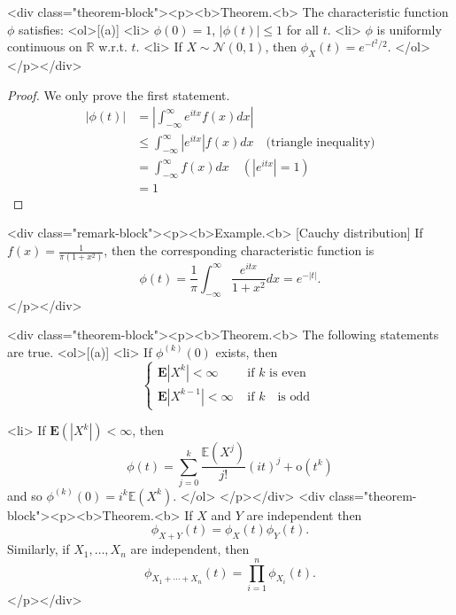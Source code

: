<div class="theorem-block"><p><b>Theorem.<b> 
The characteristic function $\phi$ satisfies:
<ol>[(a)]
    <li> $\phi(0) = 1$, $\left\vert \phi(t) \right\vert \leq 1$ for all $t$.
    <li> $\phi$ is uniformly continuous on $\mathbb{R}$ w.r.t. $t$.
    <li> If $X \sim \mathcal{N}(0,1)$, then $\phi_{X}(t) = e^{-t^2/2}$.
</ol>
</p></div>

\begin{proof}
We only prove the first statement.
$$\begin{equation}
    \begin{split}
        \left\vert \phi(t) \right\vert &= \left\vert \int_{-\infty}^\infty e^{itx} f(x)dx  \right\vert \\
        &\leq \int_{-\infty}^\infty \left\vert e^{itx} \right\vert f(x) dx \quad \text{(triangle inequality)} \\
        &= \int_{-\infty}^\infty f(x) dx \quad (\left\vert e^{itx} \right\vert=1) \\
        &= 1
    \end{split}
\end{equation}$$
\end{proof}

<div class="remark-block"><p><b>Example.<b> [Cauchy distribution]
If $f(x) = 
\frac{1}{\pi(1+x^2)}$, then the corresponding characteristic function is 
$$\begin{equation}
    \phi(t)=\frac{1}{\pi} \int_{-\infty}^{\infty} \frac{e^{i t x}}{1+x^{2}} d x = e^{-\left\vert t \right\vert}.
\end{equation}$$
</p></div>

<div class="theorem-block"><p><b>Theorem.<b> 
The following statements are true.
<ol>[(a)]
    <li> If $\phi^{(k)}(0)$ exists, then 
    $$\begin{equation}
        \left\{\begin{array}{ll}{\mathbf{E}\left|X^{k}\right|<\infty} & {\text { if $k$}  \text { is even }} \\ {\mathbf{E}\left|X^{k-1}\right|<\infty} & {\text { if $k$ } \text { is odd }}\end{array}\right.
    \end{equation}$$
    
    <li> If $\mathbf{E}(\left\vert X^k \right\vert) < \infty$, then 
    $$\begin{equation}
        \phi(t)=\sum_{j=0}^{k} \frac{\mathbb{E}\left(X^{j}\right)}{j !}(i t)^{j}+\mathrm{o}\left(t^{k}\right)
    \end{equation}$$
    and so $\phi^{(k)}(0)=i^{k} \mathbb{E}\left(X^{k}\right)$.
</ol>
</p></div>
<div class="theorem-block"><p><b>Theorem.<b> 
If $X$ and $Y$ are independent then 
$$\begin{equation}
    \phi_{X+Y}(t)=\phi_{X}(t) \phi_{Y}(t).
\end{equation}$$
Similarly, if $X_1, \dots, X_n$ are independent, then 
$$\begin{equation}
    \phi_{X_1 + \cdots + X_n}(t)= \prod_{i=1}^n \phi_{X_i}(t).
\end{equation}$$
</p></div>

